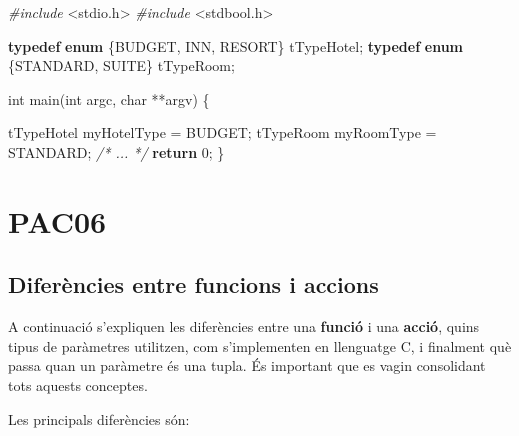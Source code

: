 \documentclass[
]{book}
\newenvironment{Shaded}{\begin{snugshade}}{\end{snugshade}}
\newcommand{\CommentTok}[1]{\textcolor[rgb]{0.56,0.35,0.01}{\textit{#1}}}
\newcommand{\ControlFlowTok}[1]{\textcolor[rgb]{0.13,0.29,0.53}{\textbf{#1}}}
\newcommand{\DataTypeTok}[1]{\textcolor[rgb]{0.13,0.29,0.53}{#1}}
\newcommand{\DecValTok}[1]{\textcolor[rgb]{0.00,0.00,0.81}{#1}}
\newcommand{\ImportTok}[1]{#1}
\newcommand{\KeywordTok}[1]{\textcolor[rgb]{0.13,0.29,0.53}{\textbf{#1}}}
\newcommand{\NormalTok}[1]{#1}
\newcommand{\PreprocessorTok}[1]{\textcolor[rgb]{0.56,0.35,0.01}{\textit{#1}}}
\begin{document}
\begin{Shaded}
\begin{Highlighting}[]
\PreprocessorTok{\#include }\ImportTok{\textless{}stdio.h\textgreater{}}
\PreprocessorTok{\#include }\ImportTok{\textless{}stdbool.h\textgreater{}}

\KeywordTok{typedef} \KeywordTok{enum}\NormalTok{ \{BUDGET, INN, RESORT\} tTypeHotel;}
\KeywordTok{typedef} \KeywordTok{enum}\NormalTok{ \{STANDARD, SUITE\} tTypeRoom;}

\DataTypeTok{int}\NormalTok{ main(}\DataTypeTok{int}\NormalTok{ argc, }\DataTypeTok{char}\NormalTok{ **argv) \{}
 
\NormalTok{    tTypeHotel myHotelType = BUDGET;}
\NormalTok{    tTypeRoom myRoomType = STANDARD;}
    \CommentTok{/* ... */}
    \ControlFlowTok{return} \DecValTok{0}\NormalTok{;}
\NormalTok{\}}
\end{Highlighting}
\end{Shaded}

\hypertarget{pac06}{%
\chapter{PAC06}\label{pac06}}

\hypertarget{diferuxe8ncies-entre-funcions-i-accions}{%
\section{Diferències entre funcions i accions}\label{diferuxe8ncies-entre-funcions-i-accions}}

A continuació s'expliquen les diferències entre una \textbf{funció} i una \textbf{acció}, quins tipus de paràmetres utilitzen, com s'implementen en llenguatge C, i finalment què passa quan un paràmetre és una tupla. És important que es vagin consolidant tots aquests conceptes.

Les principals diferències són:
\end{document}
